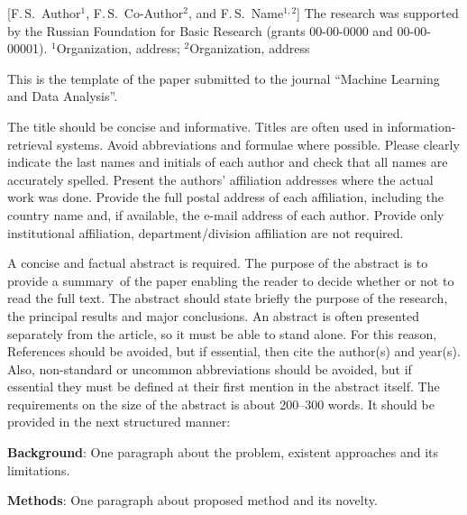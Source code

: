 \documentclass[12pt, twoside]{article}
\begin{document}
    [F.\,S.~Author$^1$, F.\,S.~Co-Author$^2$, and F.\,S.~Name$^{1, 2}$] %
\thanksEng
    {The research was
    	 supported by the Russian Foundation for Basic Research (grants 00-00-0000 and 00-00-00001).
    }
\organizationEng
    {$^1$Organization, address; $^2$Organization, address}
\abstractEng
    {This is the template of the paper submitted to the journal ``Machine Learning and Data Analysis''.
		
	\noindent
	The title should be concise and informative. Titles are often used in information-retrieval systems. Avoid abbreviations and formulae where possible.
	Please clearly indicate the last names and initials of each author and check that all names are accurately spelled. Present the authors' affiliation
	addresses where the actual work was done.
	Provide the full postal address of each affiliation, including the country name and, if available, the
	e-mail address of each author.
	Provide only institutional affiliation, department/division affiliation are not required.

	\noindent
	A concise and factual abstract is required.
	The purpose of the abstract is to provide a summary~of the paper enabling the reader to decide whether or not to read the full text.
    	The abstract should state briefly the purpose of the research, the principal results and major conclusions.
    	An abstract is often presented separately from the article, so it must be able to stand alone.
    	For this reason, References should be avoided, but if essential, then cite the author(s) and year(s).
    	Also, non-standard or uncommon abbreviations should be avoided, but if essential they must be defined at their first mention in the abstract itself.
    	The requirements on the size of the abstract is about 200--300 words.
    	It should be provided in the next structured manner:
	
	\noindent
	\textbf{Background}:	One paragraph about the problem, existent approaches and its limitations.
	
	\noindent
	\textbf{Methods}: One paragraph about proposed method and its novelty.
	
}
\end{document}
